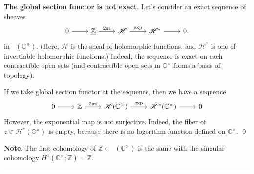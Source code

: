 \documentclass{article}
\newcommand{\separater}{\begin{center} \rule{0.5\linewidth}{0.3pt} \end{center}}
\theoremstyle{plain}
\theoremstyle{definition}
\DeclareMathOperator{\Sh}{\underline{\textsf{Sh}}}
\begin{document}
\begin{tcolorbox}
    \textbf{The global section functor is not exact}. Let's consider an exact sequence of sheaves
    \[\begin{tikzcd}
        0 & {\underline{\mathbb{Z}}} & {\mathscr{H}} & {\mathscr{H}^\ast} & 0.
        \arrow[from=1-1, to=1-2]
        \arrow["{2 \pi i}", from=1-2, to=1-3]
        \arrow["\exp", from=1-3, to=1-4]
        \arrow[from=1-4, to=1-5]
    \end{tikzcd}\]
    in $\Sh(\mathbb{C}^\times)$. (Here, $\mathscr{H}$ is the sheaf of holomorphic functions, and $\mathscr{H}^\ast$ is one of invertiable holomorphic functions.) Indeed, the sequence is exact on each contractible open sets (and contractible open sets in $\mathbb{C}^\times$ forms a basis of topology).
    
    If we take global section functor at the sequence, then we have a sequence
    \[\begin{tikzcd}
        0 & {\mathbb{Z}} & {\mathscr{H}(\mathbb{C}^\times)} & {\mathscr{H}^\ast(\mathbb{C}^\times)} & 0
        \arrow[from=1-1, to=1-2]
        \arrow["{2 \pi i}", from=1-2, to=1-3]
        \arrow["\exp", from=1-3, to=1-4]
        \arrow[from=1-4, to=1-5]
    \end{tikzcd}\]
    However, the exponential map is not surjective. Indeed, the fiber of $z \in \mathscr{H}^\ast(\mathbb{C}^\times)$ is empty, because there is no logorithm function defined on $\mathbb{C}^\times$. \qed

    \textbf{Note}. The first cohomology of $\underline{\mathbb{Z}} \in \Sh(\mathbb{C}^\times)$ is the same with the singular cohomology $H^1(\mathbb{C}^\times ; \mathbb{Z}) = \mathbb{Z}$.
\end{tcolorbox}

\separater
\end{document}
